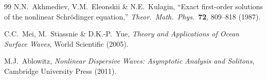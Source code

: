 \documentclass[11pt]{article}
\begin{document}
\begin{thebibliography}{99}
N.N.\ Akhmediev, V.M.\ Eleonskii \& N.E.\ Kulagin,
``Exact first-order solutions of the nonlinear Schr\"odinger equation,''
\textit{Theor.\ Math.\ Phys.}\ \textbf{72}, 809--818 (1987).

C.C.\ Mei, M.\ Stiassnie \& D.K.-P.\ Yue,
\textit{Theory and Applications of Ocean Surface Waves},
World Scientific (2005).

M.J.\ Ablowitz,
\textit{Nonlinear Dispersive Waves: Asymptotic Analysis and Solitons},
Cambridge University Press (2011).

\end{thebibliography}
\end{document}
